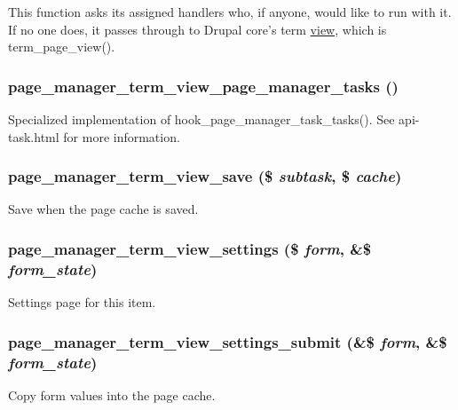 This function asks its assigned handlers who, if anyone, would like to run with it. If no one does, it passes through to Drupal core's term \hyperlink{classview}{view}, which is term\_\-page\_\-view(). \hypertarget{term__view_8inc_a8872873091306758d3592e1c46f8fc1f}{
\subsubsection[{page\_\-manager\_\-term\_\-view\_\-page\_\-manager\_\-tasks}]{\setlength{\rightskip}{0pt plus 5cm}page\_\-manager\_\-term\_\-view\_\-page\_\-manager\_\-tasks ()}}
\label{term__view_8inc_a8872873091306758d3592e1c46f8fc1f}
Specialized implementation of hook\_\-page\_\-manager\_\-task\_\-tasks(). See api-\/task.html for more information. \hypertarget{term__view_8inc_a0577f4363ced2e8fffb582f643769e74}{
\subsubsection[{page\_\-manager\_\-term\_\-view\_\-save}]{\setlength{\rightskip}{0pt plus 5cm}page\_\-manager\_\-term\_\-view\_\-save (\$ {\em subtask}, \/  \$ {\em cache})}}
\label{term__view_8inc_a0577f4363ced2e8fffb582f643769e74}
Save when the page cache is saved. \hypertarget{term__view_8inc_a5b046bdb1844cb072960bdcd4c6e226d}{
\subsubsection[{page\_\-manager\_\-term\_\-view\_\-settings}]{\setlength{\rightskip}{0pt plus 5cm}page\_\-manager\_\-term\_\-view\_\-settings (\$ {\em form}, \/  \&\$ {\em form\_\-state})}}
\label{term__view_8inc_a5b046bdb1844cb072960bdcd4c6e226d}
Settings page for this item. \hypertarget{term__view_8inc_ace6e087115b02aacf749bd3871efe692}{
\subsubsection[{page\_\-manager\_\-term\_\-view\_\-settings\_\-submit}]{\setlength{\rightskip}{0pt plus 5cm}page\_\-manager\_\-term\_\-view\_\-settings\_\-submit (\&\$ {\em form}, \/  \&\$ {\em form\_\-state})}}
\label{term__view_8inc_ace6e087115b02aacf749bd3871efe692}
Copy form values into the page cache. 